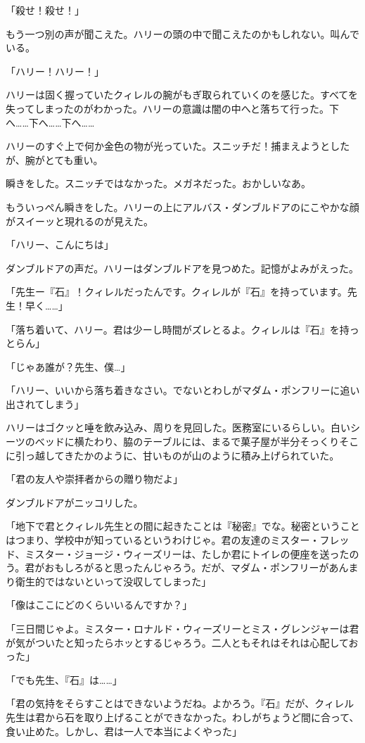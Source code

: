\documentclass[10pt,a4paper]{article}
\begin{document}
\begin{CJK}{UTF8}{min}
「殺せ！殺せ！」

もう一つ別の声が聞こえた。ハリーの頭の中で聞こえたのかもしれない。叫んでいる。

「ハリー！ハリー！」

ハリーは固く握っていたクィレルの腕がもぎ取られていくのを感じた。すべてを失ってしまったのがわかった。ハリーの意識は闇の中へと落ちて行った。下へ……下へ……下へ……

ハリーのすぐ上で何か金色の物が光っていた。スニッチだ！捕まえようとしたが、腕がとても重い。

瞬きをした。スニッチではなかった。メガネだった。おかしいなあ。

もういっぺん瞬きをした。ハリーの上にアルバス・ダンブルドアのにこやかな顔がスイーッと現れるのが見えた。

「ハリー、こんにちは」

ダンブルドアの声だ。ハリーはダンブルドアを見つめた。記憶がよみがえった。

「先生ー『石』！クィレルだったんです。クィレルが『石』を持っています。先生！早く……」

「落ち着いて、ハリー。君は少ーし時間がズレとるよ。クィレルは『石』を持っとらん」

「じゃあ誰が？先生、僕…」

「ハリー、いいから落ち着きなさい。でないとわしがマダム・ポンフリーに追い出されてしまう」

ハリーはゴクッと唾を飲み込み、周りを見回した。医務室にいるらしい。白いシーツのべッドに横たわり、脇のテーブルには、まるで菓子屋が半分そっくりそこに引っ越してきたかのように、甘いものが山のように積み上げられていた。

「君の友人や崇拝者からの贈り物だよ」

ダンブルドアがニッコリした。

「地下で君とクィレル先生との間に起きたことは『秘密』でな。秘密ということはつまり、学校中が知っているというわけじゃ。君の友達のミスター・フレッド、ミスター・ジョージ・ウィーズリーは、たしか君にトイレの便座を送ったのう。君がおもしろがると思ったんじゃろう。だが、マダム・ポンフリーがあんまり衛生的ではないといって没収してしまった」

「像はここにどのくらいいるんですか？」

「三日間じゃよ。ミスター・ロナルド・ウィーズリーとミス・グレンジャーは君が気がついたと知ったらホッとするじゃろう。二人ともそれはそれは心配しておった」

「でも先生、『石』は……」

「君の気持をそらすことはできないようだね。よかろう。『石』だが、クィレル先生は君から石を取り上げることができなかった。わしがちょうど間に合って、食い止めた。しかし、君は一人で本当によくやった」


\end{CJK}
\end{document}
